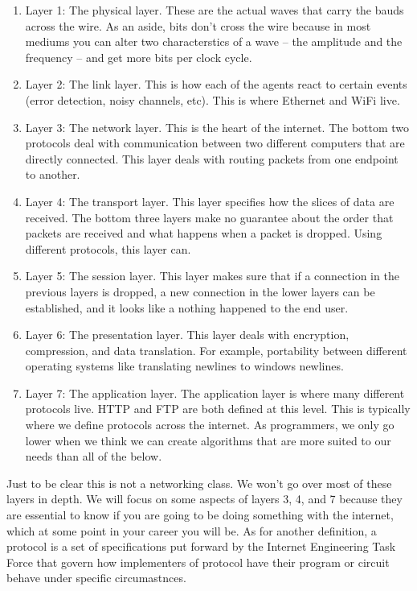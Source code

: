 \begin{enumerate}
\item Layer 1: The physical layer. These are the actual waves that carry the bauds across the wire. As an aside, bits don't cross the wire because in most mediums you can alter two characterstics of a wave -- the amplitude and the frequency -- and get more bits per clock cycle.
\item Layer 2: The link layer. This is how each of the agents react to certain events (error detection, noisy channels, etc). This is where Ethernet and WiFi live.
\item Layer 3: The network layer. This is the heart of the internet. The bottom two protocols deal with communication between two different computers that are directly connected. This layer deals with routing packets from one endpoint to another.
\item Layer 4: The transport layer. This layer specifies how the slices of data are received. The bottom three layers make no guarantee about the order that packets are received and what happens when a packet is dropped. Using different protocols, this layer can.
\item Layer 5: The session layer. This layer makes sure that if a connection in the previous layers is dropped, a new connection in the lower layers can be established, and it looks like a nothing happened to the end user.
\item Layer 6: The presentation layer. This layer deals with encryption, compression, and data translation. For example, portability between different operating systems like translating newlines to windows newlines.
\item Layer 7: The application layer. The application layer is where many different protocols live. HTTP and FTP are both defined at this level. This is typically where we define protocols across the internet. As programmers, we only go lower when we think we can create algorithms that are more suited to our needs than all of the below.
\end{enumerate}

Just to be clear this is not a networking class. We won't go over most of these layers in depth. We will focus on some aspects of layers 3, 4, and 7 because they are essential to know if you are going to be doing something with the internet, which at some point in your career you will be. As for another definition, a protocol is a set of specifications put forward by the Internet Engineering Task Force that govern how implementers of protocol have their program or circuit behave under specific circumastnces.

